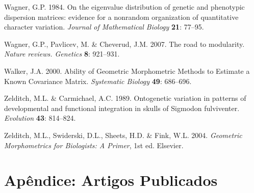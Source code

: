 \documentclass[11pt,twoside]{report}
\begin{document}
Wagner, G.P. 1984. On the eigenvalue distribution of genetic and
phenotypic dispersion matrices: evidence for a nonrandom organization of
quantitative character variation. \emph{Journal of Mathematical Biology}
\textbf{21}: 77--95.

Wagner, G.P., Pavlicev, M. \& Cheverud, J.M. 2007. The road to
modularity. \emph{Nature reviews. Genetics} \textbf{8}: 921--931.

Walker, J.A. 2000. Ability of Geometric Morphometric Methods to Estimate
a Known Covariance Matrix. \emph{Systematic Biology} \textbf{49}:
686--696.

Zelditch, M.L. \& Carmichael, A.C. 1989. Ontogenetic variation in
patterns of developmental and functional integration in skulls of
Sigmodon fulviventer. \emph{Evolution} \textbf{43}: 814--824.

Zelditch, M.L., Swiderski, D.L., Sheets, H.D. \& Fink, W.L. 2004.
\emph{Geometric Morphometrics for Biologists: A Primer}, 1st ed.
Elsevier.

\chapter*{Apêndice: Artigos Publicados}






\end{document}
